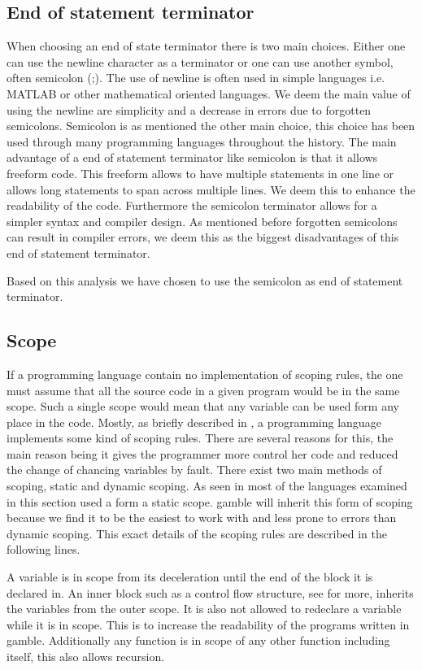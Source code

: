 \subsection*{End of statement terminator}
When choosing an end of state terminator there is two main choices.
Either one can use the newline character as a terminator or one can use another symbol, often semicolon (;).
The use of newline is often used in simple languages i.e. MATLAB or other mathematical oriented languages. 
We deem the main value of using the newline are simplicity and a decrease in errors due to forgotten semicolons.
Semicolon is as mentioned the other main choice, this choice has been used through many programming languages throughout the history. 
The main advantage of a end of statement terminator  like semicolon is that it allows freeform code. 
This freeform allows to have multiple statements in one line or allows long statements to span across multiple lines.
We deem this to enhance the readability of the code.
Furthermore the semicolon terminator allows for a simpler syntax and compiler design.
As mentioned before forgotten semicolons can result in compiler errors, we deem this as the biggest disadvantages of this end of statement terminator.

Based on this analysis we have chosen to use the semicolon as end of statement terminator.

\subsection*{Scope}
If a programming language contain no implementation of scoping rules, the one must assume that all the source code in a given program would be in the same scope.
Such a single scope would mean that any variable can be used form any place in the code. 
Mostly, as briefly described in , a programming language implements some kind of scoping rules.
There are several reasons for this, the main reason being it gives the programmer more control her code and reduced the change of chancing variables by fault.
There exist two main methods of scoping, static and dynamic scoping.
As seen in  most of the languages examined in this section used a form a static scope. 
\gls{gamble} will inherit this form of scoping because we find it to be the easiest to work with and less prone to errors than dynamic scoping.
This exact details of the scoping rules are described in the following  lines.

A variable is in scope from its deceleration until the end of the block it is declared in.
An inner block such as a control flow structure, see  for more, inherits the variables from the outer scope. 
It is also not allowed to redeclare a variable while it is in scope. 
This is to increase the readability of the programs written in \gls{gamble}.
Additionally any function is in scope of any other function including itself, this also allows recursion. 

